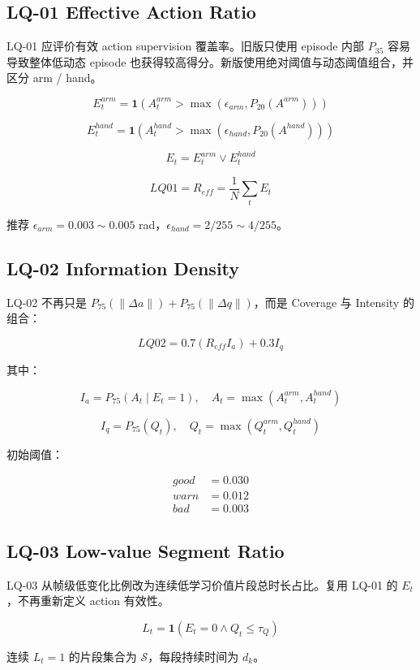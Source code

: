 \documentclass[UTF8,zihao=-4,oneside,openany]{ctexrep}
\begin{document}
\subsection{LQ-01 Effective Action Ratio}

LQ-01 应评价有效 action supervision 覆盖率。旧版只使用 episode 内部 \(P_{35}\) 容易导致整体低动态 episode 也获得较高得分。新版使用绝对阈值与动态阈值组合，并区分 arm / hand。

\[
E_t^{arm}=\mathbf1(A_t^{arm}>\max(\epsilon_{arm},P_{20}(A^{arm})))
\]

\[
E_t^{hand}=\mathbf1(A_t^{hand}>\max(\epsilon_{hand},P_{20}(A^{hand})))
\]

\[
E_t=E_t^{arm}\lor E_t^{hand}
\]

\[
LQ01=R_{eff}=\frac{1}{N}\sum_t E_t
\]

推荐 \(\epsilon_{arm}=0.003\sim0.005\) rad，\(\epsilon_{hand}=2/255\sim4/255\)。

\subsection{LQ-02 Information Density}

LQ-02 不再只是 \(P_{75}(\|\Delta a\|)+P_{75}(\|\Delta q\|)\)，而是 Coverage 与 Intensity 的组合：

\[
LQ02=0.7(R_{eff}I_a)+0.3I_q
\]

其中：

\[
I_a=P_{75}(A_t \mid E_t=1),\quad A_t=\max(A_t^{arm},A_t^{hand})
\]

\[
I_q=P_{75}(Q_t),\quad Q_t=\max(Q_t^{arm},Q_t^{hand})
\]

初始阈值：

\[
\begin{aligned}
good &= 0.030\\
warn &= 0.012\\
bad &= 0.003
\end{aligned}
\]

\subsection{LQ-03 Low-value Segment Ratio}

LQ-03 从帧级低变化比例改为连续低学习价值片段总时长占比。复用 LQ-01 的 \(E_t\)，不再重新定义 action 有效性。

\[
L_t=\mathbf1(E_t=0 \land Q_t\le \tau_Q)
\]

连续 \(L_t=1\) 的片段集合为 \(\mathcal{S}\)，每段持续时间为 \(d_k\)。
\end{document}
